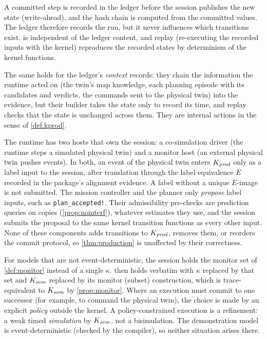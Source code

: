 \begin{remark}\label{rem:ledger}
A committed step is recorded in the ledger before the session publishes the new
state (write-ahead), and the hash chain is computed from the committed values.
The ledger therefore records the run, but it never influences which
transitions exist.  is independent of the ledger content,
and replay (re-executing the recorded inputs with the kernel) reproduces the
recorded states by determinism of the kernel functions.

The same holds for the ledger's \emph{context} records: they chain the
information the runtime acted on (the twin's map knowledge, each planning
episode with its candidates and verdicts, the commands sent to the physical
twin) into the evidence, but their builder takes the state only to record its
time, and replay checks that the state is unchanged across them. They are
internal actions in the sense of \cref{def:kprod}.
\end{remark}

\begin{remark}\label{rem:hosts}
The runtime has two hosts that own the session: a co-simulation driver (the
runtime steps a simulated physical twin) and a monitor host (an external
physical twin pushes events). In both, an event of the physical twin enters
$K_{\mathit{prod}}$ only as a label input to the session, after translation through the
label equivalence $E$ recorded in the package's alignment evidence. A label
without a unique $E$-image is not submitted. The mission controller and the
planner only \emph{propose} label inputs, such as \texttt{plan\_accepted!}. Their
admissibility pre-checks are prediction queries on copies
(\cref{prop:nointerf}), whatever estimates they use, and the session submits
the proposal to the same kernel transition functions as every other input. None
of these components adds transitions to $K_{\mathit{prod}}$, removes them, or reorders the
commit protocol, so \cref{thm:production} is unaffected by their correctness.
\end{remark}

\begin{remark}\label{rem:policy}
For models that are not event-deterministic, the session holds the monitor set of
\cref{def:monitor} instead of a single $\kappa$.  then holds
verbatim with $\kappa$ replaced by that set and $K_{\mathit{sem}}$ replaced by its monitor
(subset) construction, which is trace-equivalent to $K_{\mathit{sem}}$ by \cref{prop:monitor}.
Where an execution must commit to one successor (for example, to command the
physical twin), the choice is made by an explicit \emph{policy} outside the
kernel. A policy-constrained execution is a refinement: a weak timed
\emph{simulation} by $K_{\mathit{sem}}$, not a bisimulation. The demonstration model is
event-deterministic (checked by the compiler), so neither situation arises there.
\end{remark}
